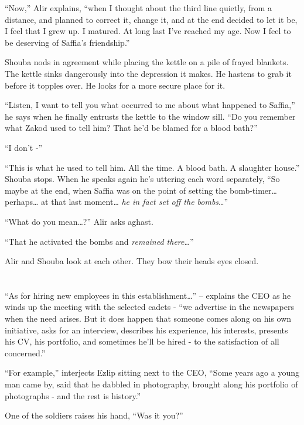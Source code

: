\documentclass[twoside,11pt]{book}
\begin{document}
``Now,'' Alir explains, ``when I thought about the third line quietly, from a
distance, and planned to correct it, change it, and at the end decided to let it be, I feel that I grew up. I matured.
At long last I've reached my age. Now I feel to be deserving of Saffia's friendship.''

Shouba nods in agreement while placing the kettle on a pile of frayed blankets. The kettle sinks dangerously into the
depression it makes. He hastens to grab it before it topples over. He looks for a more secure place for it.

``Listen, I want to tell you what occurred to me about what happened to Saffia,'' he says when
he finally entrusts the kettle to the window sill. ``Do you remember what Zakod used to tell him? That
he'd be blamed for a blood bath?''

``I don't -''

``This is what he used to tell him. All the time. A blood bath. A slaughter house.'' Shouba
stops. When he speaks again he's uttering each word separately, ``So maybe at the end, when Saffia was on
the point of setting the bomb-timer{\dots} perhaps{\dots} at that last moment{\dots} \textit{he in fact set off the
bombs}{\dots}''

``What do you mean{\ldots}?'' Alir asks aghast.

``That he activated the bombs and \textit{remained there}{\dots}''

Alir and Shouba look at each other. They bow their heads eyes closed.


\bigskip

\chapter{}

``As for hiring new employees in this establishment{\dots}'' -- explains the CEO as he winds up the
meeting with the selected cadets - ``we advertise in the newspapers when the need arises. But it does happen that
someone comes along on his own initiative, asks for an interview, describes his experience, his interests, presents his
CV, his portfolio, and sometimes he'll be hired - to the satisfaction of all concerned.''

``For example,'' interjects Ezlip sitting next to the CEO, ``Some years ago a
young man came by, said that he dabbled in photography, brought along his portfolio of photographs - and the rest is
history.''

One of the soldiers raises his hand, ``Was it you?'' \
\end{document}
